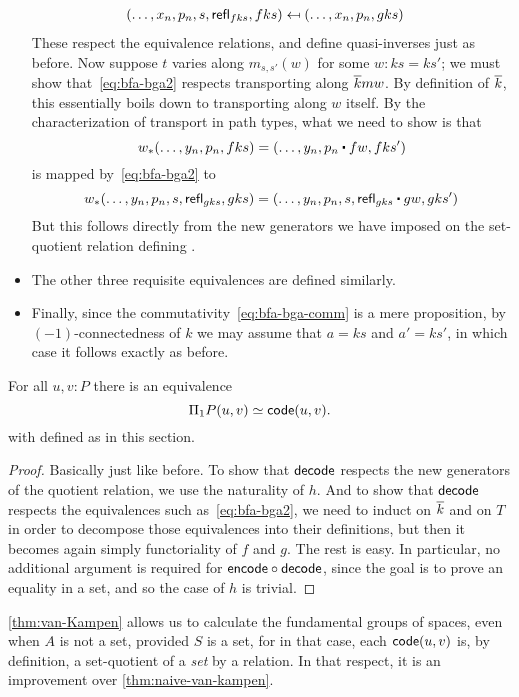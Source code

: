 \begin{itemize}
\begin{align*}
    (\dots, x_n, p_n, s, \mathsf{refl}_{fks}, fks) &\mapsfrom (\dots, x_n, p_n, gks)
  \end{align*}
  These respect the equivalence relations, and define quasi-inverses just as before.
  Now suppose $t$ varies along $m_{s,s'}(w)$ for some $w:ks=ks'$; we must show that~\eqref{eq:bfa-bga2} respects transporting along $\overline{k} mw$.
  By definition of $\overline{k}$, this essentially boils down to transporting along $w$ itself.
  By the characterization of transport in path types, what we need to show is that
  \[ w_*(\dots, y_n, p_n,fks) = (\dots,y_n, p_n \ct fw, fks') \]
  is mapped by~\eqref{eq:bfa-bga2} to
  \[ w_*(\dots,y_n,p_n,s,\refl{gks},gks) = (\dots, y_n, p_n, s, \refl{gks} \ct gw, gks') \]
  But this follows directly from the new generators we have imposed on the set-quotient relation defining \code.
\item The other three requisite equivalences are defined similarly.
\item Finally, since the commutativity~\eqref{eq:bfa-bga-comm} is a mere proposition, by $(-1)$-connectedness of $k$ we may assume that $a=ks$ and $a'=ks'$, in which case it follows exactly as before.
\end{itemize}

\begin{thm}\label{thm:van-Kampen}
  For all $u,v:P$ there is an equivalence
  \[ \Pi_1P(u,v) \simeq \mathsf{code}(u,v). \]
  with \code defined as in this section.
\end{thm}

\begin{proof}
  Basically just like before.
  To show that $\mathsf{decode}$ respects the new generators of the quotient relation, we use the naturality of $h$.
  And to show that $\mathsf{decode}$ respects the equivalences such as~\eqref{eq:bfa-bga2}, we need to induct on $\overline{k}$ and on $T$ in order to decompose those equivalences into their definitions, but then it becomes again simply functoriality of $f$ and $g$.
  The rest is easy.
  In particular, no additional argument is required for $\mathsf{encode}\circ\mathsf{decode}$, since the goal is to prove an equality in a set, and so the case of $h$ is trivial.
\end{proof}

\autoref{thm:van-Kampen} allows us to calculate the fundamental groups of
spaces, even when $A$ is not a set, provided $S$ is a set, for in that case,
each $\mathsf{code}(u,v)$ is, by definition, a set-quotient of a \emph{set} by a
relation.  In that respect, it is an improvement over
\autoref{thm:naive-van-kampen}.

